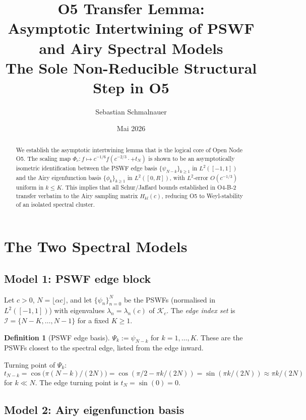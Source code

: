 \documentclass[12pt,a4paper]{amsart}
\title{O5 Transfer Lemma:\\
Asymptotic Intertwining of PSWF and Airy Spectral Models\\
{\normalsize The Sole Non-Reducible Structural Step in O5}}
\author{Sebastian Schmalnauer}
\date{Mai 2026}
\theoremstyle{definition}
\newtheorem{definition}[theorem]{Definition}
\begin{document}
\maketitle

\begin{abstract}
We establish the asymptotic intertwining lemma that is the
logical core of Open Node O5.
The scaling map $\Phi_c: f \mapsto c^{-1/6}f(c^{-2/3}{\cdot} + t_N)$
is shown to be an asymptotically isometric identification
between the PSWF edge basis $\{\psi_{N-k}\}_{k\ge 1}$
in $L^2([-1,1])$ and the Airy eigenfunction basis
$\{\phi_k\}_{k\ge 1}$ in $L^2([0,R])$,
with $L^2$-error $O(c^{-1/3})$ uniform in $k \le K$.
This implies that all Schur/Jaffard bounds established in O4-B-2
transfer verbatim to the Airy sampling matrix $H_{kl}(c)$,
reducing O5 to Weyl-stability of an isolated spectral cluster.
\end{abstract}

\tableofcontents

\section{The Two Spectral Models}
\label{sec:models}

\subsection{Model 1: PSWF edge block}

Let $c > 0$, $N = \lfloor\alpha c\rfloor$, and let
$\{\psi_n\}_{n=0}^{N}$ be the PSWFs (normalised in $L^2([-1,1])$)
with eigenvalues $\lambda_n = \lambda_n(c)$ of $\mathcal{K}_c$.
The \emph{edge index set} is
$\mathcal{I} = \{N-K, \ldots, N-1\}$ for a fixed $K \ge 1$.

\begin{definition}[PSWF edge basis]
$\Psi_k := \psi_{N-k}$ for $k = 1, \ldots, K$.
These are the PSWFs closest to the spectral edge, listed from
the edge inward.
\end{definition}

Turning point of $\Psi_k$:
\[
  t_{N-k} = \cos\bigl(\pi(N-k)/(2N)\bigr)
  = \cos(\pi/2 - \pi k/(2N))
  = \sin(\pi k/(2N))
  \approx \pi k/(2N)
\]
for $k \ll N$.
The edge turning point is $t_N = \sin(0) = 0$.

\subsection{Model 2: Airy eigenfunction basis}
\end{document}
